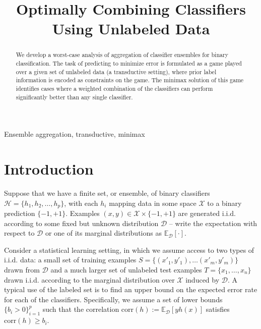 \documentclass{colt2015} %
\newcommand{\corr}{\mbox{corr}}
\newcommand{\evp}[2]{\mathbb{E}_{#2} \left[#1\right]} %
\newcommand{\cH}{\mathcal{H}}
\newcommand{\cX}{\mathcal{X}}
\newcommand{\cD}{\mathcal{D}}
\begin{document}
\title[Minimax Classifier Aggregation]{Optimally Combining Classifiers Using Unlabeled Data}



\maketitle

\begin{abstract}

We develop a worst-case analysis of aggregation of classifier ensembles for binary classification. 
The task of predicting to minimize error is formulated as a game played 
over a given set of unlabeled data (a transductive setting), 
where prior label information is encoded as constraints on the game. 
The minimax solution of this game identifies cases where a
weighted combination of the classifiers can perform significantly
better than any single classifier.

\end{abstract}
\begin{keywords}
Ensemble aggregation, transductive, minimax
\end{keywords}



\section{Introduction}
Suppose that we have a finite set, or ensemble, of binary classifiers
$\cH = \{ h_1,h_2,\ldots,h_p \}$, 
with each $h_i$ mapping data in some space $\cX$ to a binary prediction $\{-1,+1\}$. 
Examples $(x,y) \in \cX \times \{-1,+1\}$ 
are generated i.i.d. according to some fixed but unknown distribution 
$\cD$ -- write the expectation with respect to $\cD$ or one of its marginal distributions as $\evp{\cdot}{\cD}$.

Consider a statistical learning setting, 
in which we assume access to two types of i.i.d. data: a small set of training examples  
$S = \{(x'_1,y'_1),\ldots(x'_m,y'_m)\}$ drawn from $\cD$ and a much larger
set of unlabeled test examples $T = \{x_1,\ldots,x_n\}$ drawn i.i.d. 
according to the marginal distribution over $\cX$ induced by $\cD$. 
A typical use of the labeled set is to find an upper bound on the expected error rate for each of the classifiers. 
Specifically, we assume a set of lower bounds $\{b_i>0\}_{i=1}^p$ such
that the correlation $\corr(h) := \evp{y h (x)}{\cD}$ satisfies
$\corr(h) \geq b_i$.
\end{document}

